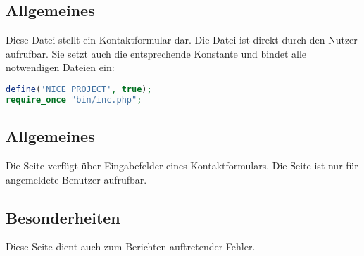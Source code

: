 \subsection{Allgemeines} Diese Datei stellt ein Kontaktformular dar.
Die Datei ist direkt durch den Nutzer aufrufbar. Sie setzt auch die entsprechende Konstante und bindet alle notwendigen Dateien ein:
\begin{lstlisting}[language=php]
define('NICE_PROJECT', true);
require_once "bin/inc.php";
\end{lstlisting}
\subsection{Allgemeines}
Die Seite verfügt über Eingabefelder eines Kontaktformulars. Die Seite ist nur für angemeldete Benutzer aufrufbar.
\subsection{Besonderheiten}
Diese Seite dient auch zum Berichten auftretender Fehler.